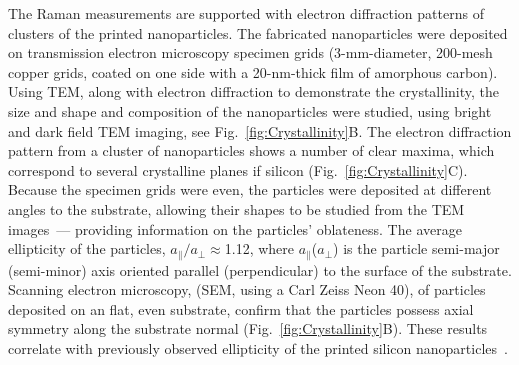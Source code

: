                 The Raman measurements are supported with electron diffraction patterns of clusters of the printed nanoparticles. The fabricated nanoparticles
            were deposited on transmission electron microscopy specimen grids (3-mm-diameter, 200-mesh copper grids, coated on one side with a 20-nm-thick
            film of amorphous carbon). Using TEM, along with electron diffraction to demonstrate the crystallinity, the size and shape and composition
            of the nanoparticles were studied, using bright and dark field TEM imaging, see Fig.~\ref{fig:Crystallinity}B.
                The electron diffraction pattern from a cluster of nanoparticles shows a number of clear maxima, which correspond to several crystalline planes
            if silicon (Fig.~\ref{fig:Crystallinity}C). Because the specimen grids were even, the particles were deposited at different angles to the substrate,
            allowing their shapes to be studied from the TEM images~--- providing information on the particles' oblateness. The average ellipticity
            of the particles, $a_{\parallel}/a_{\perp}\approx$1.12, where $a_{\parallel}$($a_{\perp}$) is the particle semi-major
            (semi-minor) axis oriented parallel (perpendicular) to the surface of the substrate. Scanning electron microscopy, (SEM, using a Carl Zeiss Neon 40),
            of particles deposited on an flat, even substrate, confirm that the particles possess axial symmetry along the substrate
            normal (Fig.~\ref{fig:Crystallinity}B). These results correlate with previously observed ellipticity of the printed silicon
            nanoparticles~\cite{zywietz2014laser}.

